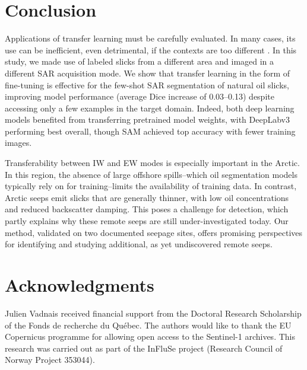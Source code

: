 \documentclass[lettersize,journal]{IEEEtran}
\begin{document}
\section{Conclusion}
Applications of transfer learning must be carefully evaluated. In many cases, its use can be inefficient, even detrimental, if the contexts are too different \cite{mensinkFactorsInfluenceTransfer2022}.
In this study, we made use of labeled slicks from a different area and imaged in a different SAR acquisition mode. We show that transfer learning in the form of fine-tuning is effective for the few-shot SAR segmentation
of natural oil slicks, improving model performance (average Dice increase of 0.03--0.13) despite accessing only a few examples in the target domain. 
Indeed, both deep learning models benefited from transferring pretrained model weights, 
with DeepLabv3 performing best overall, though SAM achieved top accuracy with fewer training images.

Transferability between IW and EW modes is especially important in the Arctic. In this region, the absence of large offshore spills--which oil segmentation models typically
rely on for training--limits the availability of training data. In contrast, Arctic seeps emit slicks that are generally thinner, with low oil concentrations and reduced backscatter damping.
This poses a challenge for detection, which partly explains why these remote seeps are still under-investigated today. Our method, validated on two documented seepage sites, offers promising perspectives for
identifying and studying additional, as yet undiscovered remote seeps.

\section*{Acknowledgments}
Julien Vadnais received financial support from the Doctoral Research Scholarship of the Fonds de recherche du Québec. 
The authors would like to thank the EU Copernicus programme for allowing open access to the Sentinel-1 archives.
This research was carried out as part of the InFluSe project (Research Council of Norway Project 353044).


\end{document}
